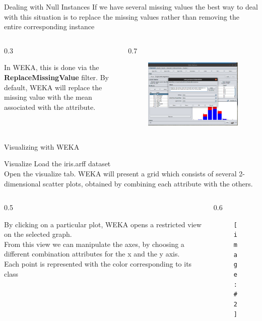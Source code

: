 \documentclass{beamer}
\newcommand{\cblue}[1]{{\usebeamercolor[fg]{structure} #1}}
\newcommand{\cols}[4]{
	\begin{columns}[t]
	\begin{column}{#1\textwidth}
		#3
	\end{column}
	\begin{column}{#2\textwidth}
		#4
	\end{column}
	\end{columns}
	
}
\newcommand{\fig}[2]{
	\begin{figure}[!h]
	\texttt{[image: \#2]}
	\end{figure}
}
\begin{document}
\begin{frame}{Dealing with Null Instances}
If we have several missing values the best way to deal with this situation is
to replace the missing values rather than removing the entire corresponding instance
\vskip 0.3cm
\cols{0.3}{0.7}{
In WEKA, this is done via the \textbf{ReplaceMissingValue} filter. 
By default, WEKA will replace the missing value with the mean
associated with the attribute.
}
{
\begin{figure}
\includegraphics[scale=0.2]{img/missing.png}
\end{figure}
}

\end{frame}


\begin{frame}[noframenumbering]{}
\Huge
\centering
\cblue{Visualizing with WEKA}
\end{frame}

\begin{frame}{Visualize}
Load the \textsf{iris.arff} dataset\\[5pt]
Open the visualize tab.  WEKA will present a grid which consists
of several 2-dimensional scatter plots, obtained by combining each attribute
with the others.\\[5pt]
\cols{0.5}{0.6}{
By clicking on a particular plot, WEKA opens a restricted view on the selected graph.\\[5pt]
From this view we can manipulate the axes, by choosing a different combination attributes
for the x and the y axis.\\
Each point is represented with the color corresponding to its class
}{
\fig{0.5}{img/visualize.png}
}

\end{frame}
\end{document}
